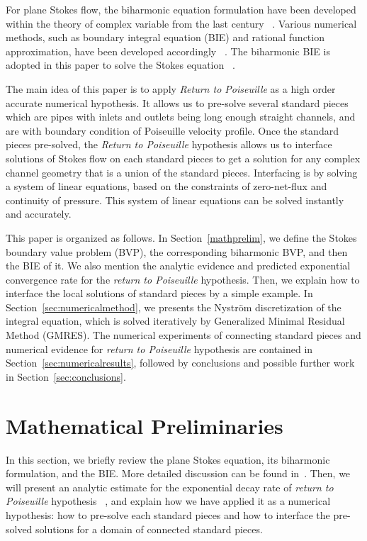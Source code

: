 \documentclass[10pt,twocolumn,letterpaper]{article}
\begin{document}
For plane Stokes flow, 
the biharmonic equation formulation have been developed 
within the theory of complex variable from the last century
~\cite{ladyzhenskayaMathematicalTheoryViscous1964}. 
Various numerical methods,
such as boundary integral equation (BIE) and rational function approximation,
have been developed accordingly
~\cite{greengardIntegralEquationMethods1996,trefethenApproximationTheoryApproximation2019}.
The biharmonic BIE is adopted in this paper to solve the Stokes equation
~\cite{greengardIntegralEquationMethods1996}. 


The main idea of this paper is to apply \textit{Return to Poiseuille} 
as a high order accurate numerical hypothesis. 
It allows us to pre-solve several standard pieces 
which are pipes with inlets and outlets being long enough straight channels, 
and are with boundary condition of Poiseuille velocity profile. 
Once the standard pieces pre-solved, 
the \textit{Return to Poiseuille} hypothesis allows us to 
interface solutions of Stokes flow on each standard pieces 
to get a solution for any complex channel geometry that is a union of the standard pieces. 
Interfacing is by solving a system of linear equations, 
based on the constraints of zero-net-flux and continuity of pressure. 
This system of linear equations can be solved instantly and accurately.

This paper is organized as follows. 
In Section~\ref{mathprelim}, we define the Stokes boundary value problem (BVP), 
the corresponding biharmonic BVP, and then the BIE of it. 
We also mention the analytic evidence and predicted exponential convergence rate for 
the \textit{return to Poiseuille} hypothesis. 
Then, we explain how to interface the local solutions of standard pieces 
by a simple example. 
In Section~\ref{sec:numericalmethod}, 
we presents the Nystr\"om discretization of the integral equation, 
which is solved iteratively by Generalized Minimal Residual Method (GMRES).
The numerical experiments of connecting standard pieces and numerical evidence
for \textit{return to Poiseuille} hypothesis are contained in Section~\ref{sec:numericalresults}, 
followed by conclusions and possible further work
in Section~\ref{sec:conclusions}.

\section{Mathematical Preliminaries\label{mathprelim}}

In this section, 
we briefly review the plane Stokes equation, its biharmonic formulation, 
and the BIE. 
More detailed discussion can be found in~\cite{greengardIntegralEquationMethods1996}. 
Then, we will present an analytic estimate for 
the exponential decay rate of \textit{return to Poiseuille} hypothesis
~\cite{gregoryTractionBoundaryValue1980}, 
and explain how we have applied it as a numerical hypothesis: how to pre-solve each
standard pieces and how to interface the pre-solved solutions for a domain of
connected standard pieces.
\end{document}
